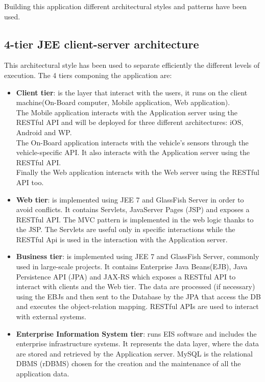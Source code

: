Building this application different architectural styles and patterns have been used.
\subsection{4-tier JEE client-server architecture}
	This architectural style has been used to separate efficiently the different levels of execution. The 4 tiers componing the application are:
	\begin{itemize}
		\item{\textbf{Client tier}: is the layer that interact with the users, it runs on the client machine(On-Board computer, Mobile application, Web application). 
		\\The Mobile application interacts with the Application server using the RESTful API and will be deployed for three different architectures: iOS, Android and WP.
		\\The On-Board application interacts with the vehicle's sensors through the vehicle-specific API. It also interacts with the Application server using the RESTful API.
		\\Finally the Web application interacts with the Web server using the RESTful API too.}
		\item{\textbf{Web tier}: is implemented using JEE 7 and GlassFish Server in order to avoid conflicts. It contains Servlets, JavaServer Pages (JSP) and exposes a RESTful API. The MVC pattern is implemented in the web logic thanks to the JSP. The Servlets are useful only in specific interactions while the RESTful Api is used in the interaction with the Application server.}
		\item{\textbf{Business tier}: is implemented using JEE 7 and GlassFish Server, commonly used in large-scale projects. It contains Enterprise Java Beans(EJB), Java Persistence API (JPA) and JAX-RS which exposes a RESTful API to interact with clients and the Web tier. The data are processed (if necessary) using the EBJs and then sent to the Database by the JPA that access the DB and executes the object-relation mapping. RESTful APIs are used to interact with external systems.}
		\item{\textbf{Enterprise Information System tier}: runs EIS software and includes the enterprise infrastructure systems. It represents the data layer, where the data are stored and retrieved by the Application server. MySQL is the relational DBMS (rDBMS) chosen for the creation and the maintenance of all the application data.}
	\end{itemize}
